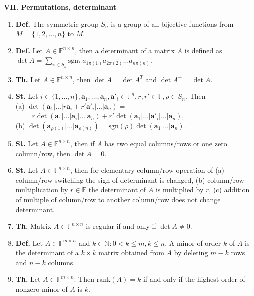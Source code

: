 \documentclass{article}
\newcommand{\<}{\left<}
\renewcommand{\>}{\right>}
\newcommand{\rank}{\text{rank}}
\newcommand{\sgn}{\text{sgn}}
\newcommand*\conj[1]{\overline{#1}}
\newcommand{\N}{\mathbb{N}}
\newcommand{\F}{\mathbb{F}}
\newcommand{\define}{\textbf{Def. }}
\newcommand{\state}{\textbf{St. }}
\newcommand{\theor}{\textbf{Th. }}
\begin{document}
\begin{multicols}{3}
\begin{enumerate}[itemsep=2pt, topsep=2pt, partopsep=2pt, parsep=2pt]
    \end{enumerate}

    \textbf{VII. Permutations, determinant}

    \begin{enumerate}[itemsep=2pt, topsep=2pt, partopsep=2pt, parsep=2pt]

        \item \define The symmetric group $S_n$ is a group of all bijective functions from $M=\{1,2,\ldots,n\}$ to $M$.

        \item \define Let $A\in\F^{n\times n}$, then a determinant of a matrix $A$ is defined as $\det A=\sum_{\pi\in S_n}\sgn\pi a_{1\pi(1)}a_{2\pi(2)}\ldots a_{n\pi(n)}$.
        \item \theor Let $A\in\F^{n\times n}$, then $\det A=\det A^T$ and $\det A^+=\conj{\det A}$.
        \item \state Let $i\in\{1,\ldots,n\},\bm a_1,\ldots,\bm a_n,\bm a'_i\in\F^n,r,r'\in\F,\rho\in S_n$. Then\\(a) $\det\left(\bm a_1|\ldots|r\bm a_i+r'\bm a'_i|\ldots|\bm a_n\right)=$\\${}\quad=r\det\left(\bm a_1|\ldots|\bm a_i|\ldots|\bm a_n\right)+r'\det\left(\bm a_1|\ldots|\bm a'_i|\ldots|\bm a_n\right)$,\\(b) $\det\left(\bm a_{\rho(1)}|\ldots|\bm a_{\rho(n)}\right)=\sgn\left(\rho\right)\det\left(\bm a_1|\ldots|\bm a_n\right)$.\
        \item \state Let $A\in\F^{n\times n}$, then if $A$ has two equal columns/rows or one zero column/row, then $\det A=0$.
        \item \state Let $A\in\F^{n\times n}$, then for elementary column/row operation of
        (a) column/row switching the sign of determinant is changed,
        (b) column/row multiplication by $r\in\F$ the determinant of $A$ is multiplied by $r$,
        (c) addition of multiple of column/row to another column/row does not change determinant.
        \item \theor Matrix $A\in\F^{n\times n}$ is regular if and only if $\det A\neq 0$.
        \item \define Let $A\in\F^{m\times n}$ and $k\in\N:0<k\leq m,k\leq n$. A minor of order $k$ of $A$ is the determinant of a $k\times k$ matrix obtained from $A$ by deleting $m-k$ rows and $n-k$ columns.
        \item \theor Let $A\in\F^{m\times n}$. Then $\rank\left(A\right)=k$ if and only if the highest order of nonzero minor of $A$ is $k$.

\end{enumerate}
\end{multicols}
\end{document}
